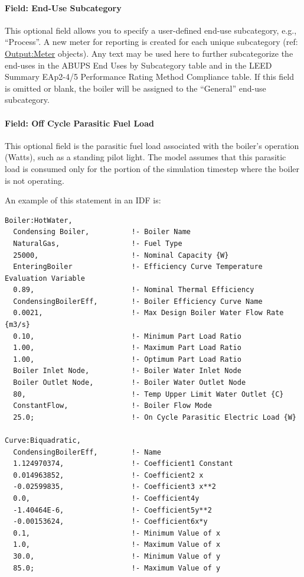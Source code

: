 \paragraph{Field: End-Use Subcategory}\label{end-use-subcategory-10}

This optional field allows you to specify a user-defined end-use subcategory, e.g., ``Process''. A new meter for reporting is created for each unique subcategory (ref: \hyperref[outputmeter-and-outputmetermeterfileonly]{Output:Meter} objects). Any text may be used here to further subcategorize the end-uses in the ABUPS End Uses by Subcategory table and in the LEED Summary EAp2-4/5 Performance Rating Method Compliance table. If this field is omitted or blank, the boiler will be assigned to the ``General'' end-use subcategory.

\paragraph{Field: Off Cycle Parasitic Fuel Load}\label{field-boiler-parasitic-fuel-load}

This optional field is the parasitic fuel load associated with the boiler's operation (Watts), such as a standing pilot light. The model assumes that this parasitic load is consumed only for the portion of the simulation timestep where the boiler is not operating.

An example of this statement in an IDF is:

\begin{lstlisting}
Boiler:HotWater,
  Condensing Boiler,          !- Boiler Name
  NaturalGas,                 !- Fuel Type
  25000,                      !- Nominal Capacity {W}
  EnteringBoiler              !- Efficiency Curve Temperature Evaluation Variable
  0.89,                       !- Nominal Thermal Efficiency
  CondensingBoilerEff,        !- Boiler Efficiency Curve Name
  0.0021,                     !- Max Design Boiler Water Flow Rate {m3/s}
  0.10,                       !- Minimum Part Load Ratio
  1.00,                       !- Maximum Part Load Ratio
  1.00,                       !- Optimum Part Load Ratio
  Boiler Inlet Node,          !- Boiler Water Inlet Node
  Boiler Outlet Node,         !- Boiler Water Outlet Node
  80,                         !- Temp Upper Limit Water Outlet {C}
  ConstantFlow,               !- Boiler Flow Mode
  25.0;                       !- On Cycle Parasitic Electric Load {W}

Curve:Biquadratic,
  CondensingBoilerEff,        !- Name
  1.124970374,                !- Coefficient1 Constant
  0.014963852,                !- Coefficient2 x
  -0.02599835,                !- Coefficient3 x**2
  0.0,                        !- Coefficient4y
  -1.40464E-6,                !- Coefficient5y**2
  -0.00153624,                !- Coefficient6x*y
  0.1,                        !- Minimum Value of x
  1.0,                        !- Maximum Value of x
  30.0,                       !- Minimum Value of y
  85.0;                       !- Maximum Value of y
\end{lstlisting}

